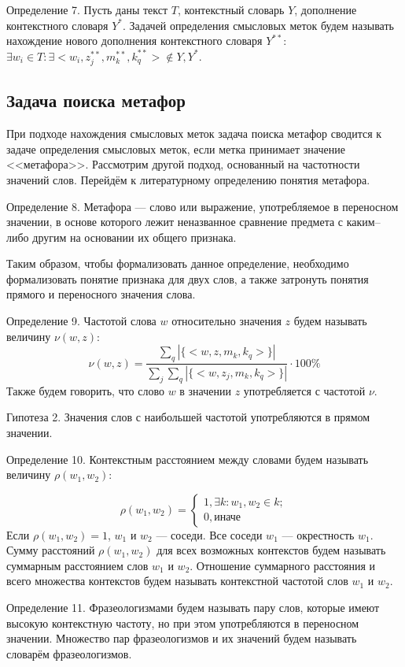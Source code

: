 \documentclass[12pt,twoside]{article}
\begin{document}
Определение 7. Пусть даны текст $T$, контекстный словарь $Y$, дополнение контекстного словаря $Y^*$. Задачей определения смысловых меток будем называть нахождение нового дополнения контекстного словаря $Y^{**}$: $\exists w_i \in T: \exists <w_i, z^{**}_j, m^{**}_k, k^{**}_q> \notin Y, Y^*$.  


\subsection{Задача поиска метафор}
При подходе нахождения смысловых меток задача поиска метафор сводится к задаче определения смысловых меток, если метка принимает значение <<метафора>>. Рассмотрим другой подход, основанный на частотности значений слов. Перейдём к литературному определению понятия метафора.

Определение 8. Метафора --- слово или выражение, употребляемое в переносном значении, в основе которого лежит неназванное сравнение предмета с каким--либо другим на основании их общего признака.

Таким образом, чтобы формализовать данное определение, необходимо формализовать понятие признака для двух слов, а также затронуть понятия прямого и переносного значения слова. 

Определение 9. Частотой слова $w$ относительно значения $z$ будем называть величину $\nu(w,z):$
\[
\nu(w,z) = \frac{\sum_{q}|\{<w, z, m_k, k_q>\}|}{\sum_{j}\sum_{q}|\{<w, z_j, m_k, k_q>\}|} \cdot 100\%
\]
Также будем говорить, что слово $w$ в значении $z$ употребляется с частотой $\nu$.


Гипотеза 2. Значения слов с наибольшей частотой употребляются в прямом значении.


Определение 10. Контекстным расстоянием между словами будем называть величину $\rho (w_1, w_2):$

\[\rho (w_1, w_2) =
\begin{cases}
1, \exists k: w_1, w_2 \in k; \\
0, \text{иначе}
\end{cases}
\]
Если $\rho (w_1, w_2)=1$, $w_1$ и $w_2$ --- соседи. Все соседи $w_1$ --- окрестность $w_1$.
Сумму расстояний $\rho (w_1, w_2)$ для всех возможных контекстов будем называть суммарным расстоянием слов $w_1$ и $w_2$. Отношение суммарного расстояния и всего множества контекстов будем называть контекстной частотой слов $w_1$ и $w_2$. 

Определение 11. Фразеологизмами будем называть пару слов, которые имеют высокую контекстную частоту, но при этом употребляются в переносном значении. Множество пар фразеологизмов и их значений будем называть словарём фразеологизмов.
\end{document}
